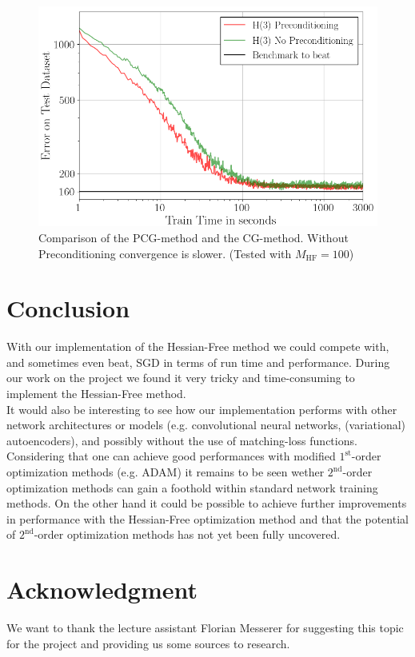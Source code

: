 \documentclass[conference]{IEEEtran}
\begin{document}
	
	\begin{figure}[htbp]
		\centerline{\includegraphics[scale=0.53]{Precond.png}}
		\caption{Comparison of the PCG-method and the CG-method. Without Preconditioning convergence is slower. (Tested with $M_{\mathrm{HF}}=100$)}
		\label{fig4}
	\end{figure}
	
	
	
	\section{Conclusion}
	\noindent
	With our implementation of the Hessian-Free method we could compete with, and sometimes even beat, SGD in terms of run time and performance.
	During our work on the project we found it very tricky and time-consuming to implement the Hessian-Free method.\\
	It would also be interesting to see how our implementation performs with other network architectures or models (e.g. convolutional neural networks, (variational) autoencoders), and possibly without the use of matching-loss functions.\\
	Considering that one can achieve good performances with modified $1^{\text{st}}$-order optimization methods (e.g. ADAM) it remains to be seen wether $2^{\text{nd}}$-order optimization methods can gain a foothold within standard network training methods. On the other hand it could be possible to achieve further improvements in performance with the Hessian-Free optimization method and that the potential of $2^{\text{nd}}$-order optimization methods has not yet been fully uncovered.
	
	\section*{Acknowledgment}
	\noindent
	We want to thank the lecture assistant Florian Messerer for suggesting this topic for the project and providing us some sources to research.
	
\end{document}
